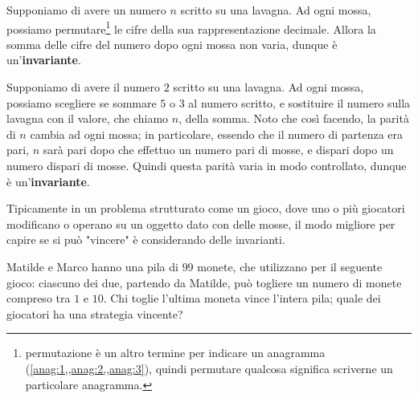 \documentclass[11pt]{scrartcl}
\begin{document}
	\begin{example}
		Supponiamo di avere un numero $n$ scritto su una lavagna. Ad ogni mossa, possiamo permutare\footnote{permutazione è un altro termine per indicare un anagramma (\cref{anag:1,,anag:2,,anag:3}), quindi permutare qualcosa significa scriverne un particolare anagramma.} le cifre della sua rappresentazione decimale. Allora la somma delle cifre del numero dopo ogni mossa non varia, dunque è un'\textbf{invariante}.
	\end{example}
	\begin{example}
		Supponiamo di avere il numero $2$ scritto su una lavagna. Ad ogni mossa, possiamo scegliere se sommare $5$ o $3$ al numero scritto, e sostituire il numero sulla lavagna con il valore, che chiamo $n$,  della somma. Noto che così facendo, la parità di $n$ cambia ad ogni mossa; in particolare, essendo che il numero di partenza era pari, $n$ sarà pari dopo che effettuo un numero pari di mosse, e dispari dopo un numero dispari di mosse. Quindi questa parità varia in modo controllato, dunque è un'\textbf{invariante}.
	\end{example}
	Tipicamente in un problema strutturato come un gioco, dove uno o più giocatori modificano o operano su un oggetto dato con delle mosse, il modo migliore per capire se si può "vincere" è considerando delle invarianti.
	\begin{exercise}
		Matilde e Marco hanno una pila di $99$ monete, che utilizzano per il seguente gioco: ciascuno dei due, partendo da Matilde, può togliere un numero di monete compreso tra $1$ e $10$. Chi toglie l'ultima moneta vince l'intera pila; quale dei giocatori ha una strategia vincente?
	\end{exercise}
\end{document}
